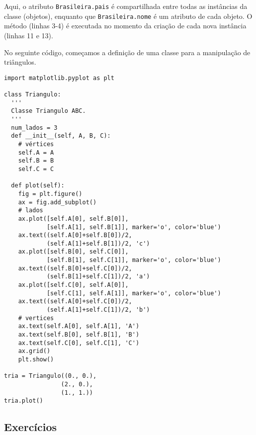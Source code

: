 Aqui, o atributo \lstinline+Brasileira.pais+ é compartilhada entre todas as instâncias da classe (objetos), enquanto que \lstinline+Brasileira.nome+ é um atributo de cada objeto. O método {\PYTHONobjectDOTinit} (linhas 3-4) é executada no momento da criação de cada nova instância (linhas 11 e 13).

\begin{ex}\label{cap_oo_sec_class:ex:triangulo}
  No seguinte código, começamos a definição de uma classe para a manipulação de triângulos.

\begin{lstlisting}[caption=classTriangulo.py, label=cap_poo_sec_class:cod:classTriangulo]
import matplotlib.pyplot as plt

class Triangulo:
  '''
  Classe Triangulo ABC.
  '''
  num_lados = 3
  def __init__(self, A, B, C):
    # vértices
    self.A = A
    self.B = B
    self.C = C

  def plot(self):
    fig = plt.figure()
    ax = fig.add_subplot()
    # lados
    ax.plot([self.A[0], self.B[0]],
            [self.A[1], self.B[1]], marker='o', color='blue')
    ax.text((self.A[0]+self.B[0])/2,
            (self.A[1]+self.B[1])/2, 'c')
    ax.plot([self.B[0], self.C[0]],
            [self.B[1], self.C[1]], marker='o', color='blue')
    ax.text((self.B[0]+self.C[0])/2,
            (self.B[1]+self.C[1])/2, 'a')
    ax.plot([self.C[0], self.A[0]],
            [self.C[1], self.A[1]], marker='o', color='blue')
    ax.text((self.A[0]+self.C[0])/2,
            (self.A[1]+self.C[1])/2, 'b')
    # vertices
    ax.text(self.A[0], self.A[1], 'A')
    ax.text(self.B[0], self.B[1], 'B')
    ax.text(self.C[0], self.C[1], 'C')
    ax.grid()
    plt.show()

tria = Triangulo((0., 0.),
                (2., 0.),
                (1., 1.))
tria.plot()
\end{lstlisting}

\end{ex}

\subsection{Exercícios}


